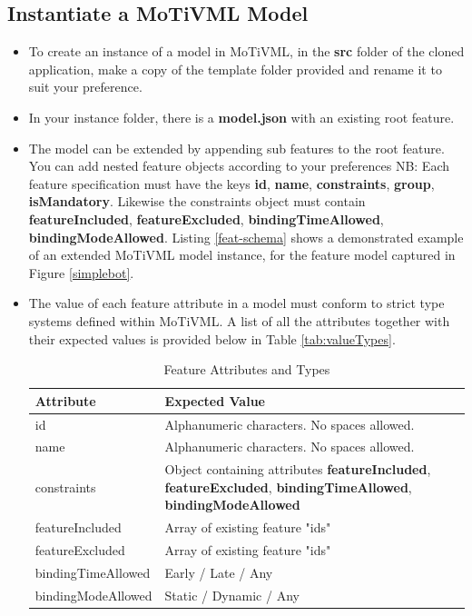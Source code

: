 \documentclass{article}
\begin{document}
\subsection{Instantiate a MoTiVML Model}
\begin{itemize}
	\item To create an instance of a model in MoTiVML, in the \textbf{src} folder of the cloned application, make a copy of the template folder provided and rename it to suit your preference.
	
	\item In your instance folder, there is a \textbf{model.json} with an existing root feature.
	
	\item The model can be extended by appending sub features to the root feature. You can add nested feature objects according to your preferences NB: Each feature specification must have the keys \textbf{id}, \textbf{name}, \textbf{constraints}, \textbf{group}, \textbf{isMandatory}. Likewise the constraints object must contain \textbf{featureIncluded}, \textbf{featureExcluded}, \textbf{bindingTimeAllowed}, \textbf{bindingModeAllowed}. Listing \ref{feat-schema} shows a demonstrated example of an extended MoTiVML model instance, for the feature model captured in Figure \ref{simplebot}.
	
	\item The value of each feature attribute in a model must conform to strict type systems defined within MoTiVML. A list of all the attributes together with their expected values is provided below in Table \ref{tab:valueTypes}.
	
	\begin{table}[H]
		\caption{Feature Attributes and Types}
			\begin{tabular}{|l|p{10cm}|}
				\hline
				Attribute & Expected Value \\\hline
				id & Alphanumeric characters. No spaces allowed.   \\ \hline
				name & Alphanumeric characters. No spaces allowed.   \\ \hline
				constraints & Object containing attributes \textbf{featureIncluded}, \textbf{featureExcluded}, \textbf{bindingTimeAllowed}, \textbf{bindingModeAllowed}  \\ \hline
				featureIncluded & Array of existing feature "ids" \\ \hline
				
				featureExcluded & Array of existing feature "ids" \\ \hline
				bindingTimeAllowed & Early / Late / Any \\ \hline
				bindingModeAllowed & Static / Dynamic / Any \\ \hline
				

\end{tabular}
\end{table}
\end{itemize}
\end{document}
